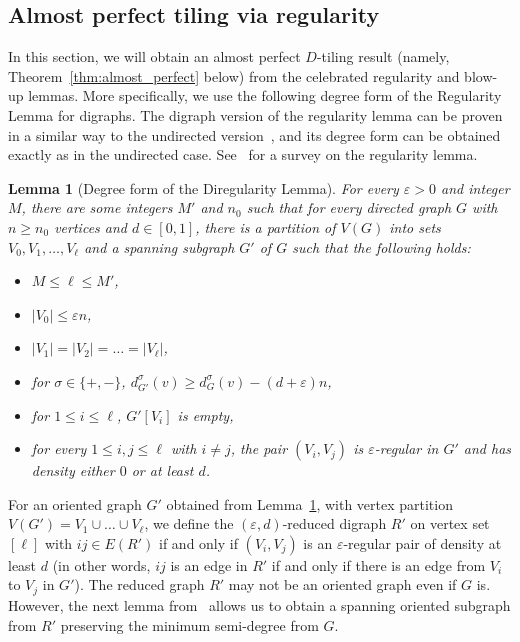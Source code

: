 \documentclass[11pt]{amsart}
\newtheorem{lemma}[theorem]{Lemma}
\newcommand{\veps}{\varepsilon}
\begin{document}
\subsection{Almost perfect tiling via regularity} \label{subsec:prelim}

In this section, we will obtain an almost perfect $D$-tiling result (namely, Theorem~\ref{thm:almost_perfect} below) from the celebrated regularity and blow-up lemmas. More specifically, we use the following degree form of the Regularity Lemma for digraphs. The digraph version of the regularity lemma can be proven in a similar way to the undirected version~\cite{alon}, and its degree form can be obtained exactly as in the undirected case. See~\cite{regularity} for a survey on the regularity lemma.

\begin{lemma}[Degree form of the Diregularity Lemma]\label{lem:di-regularity}
For every $\veps>0$ and integer $M$, there are some integers $M'$ and $n_0$ such that for every directed graph $G$ with $n\ge n_0$ vertices and $d \in [0,1]$, there is a partition of $V(G)$ into sets $V_0,V_1,\dots,V_\ell$ and a spanning subgraph $G'$ of $G$ such that the following holds:
\begin{itemize}
    \item $M\le \ell \le M'$,
    \item $|V_0|\le \veps n$,
    \item $|V_1|=|V_2|=\dots=|V_\ell|$,
    \item for $\sigma\in\{+,-\}$, $d^\sigma_{G'}(v)\ge d^\sigma_G(v)-(d+\veps)n$,
    \item for $1\le i\le \ell$, $G'[V_i]$ is empty,
    \item for every $1\le i,j\le \ell$ with $i \neq j$, the pair $(V_i,V_j)$ is $\veps$-regular in $G'$ and has density either $0$ or at least $d$.
\end{itemize}       
\end{lemma}

For an oriented graph $G'$ obtained from Lemma~\ref{lem:di-regularity}, with vertex partition $V(G') = V_1 \cup \dots \cup V_\ell$, we define the $(\veps, d)$-reduced digraph $R'$ on vertex set $[\ell]$ with $ij \in E(R')$ if and only if $(V_i, V_j)$ is an $\veps$-regular pair of density at least $d$ (in other words, $ij$ is an edge in $R'$ if and only if there is an edge from $V_i$ to $V_j$ in $G'$). The reduced graph $R'$ may not be an oriented graph even if $G$ is. However, the next lemma from~\cite{kelly} allows us to obtain a spanning oriented subgraph from $R'$ preserving the minimum semi-degree from $G$.
\end{document}
